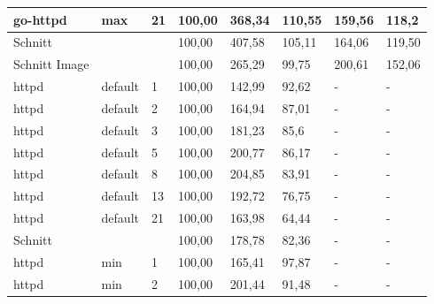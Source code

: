 \begin{footnotesize}
\begin{longtable}{llllllll}
		go-httpd       & max     & 21         & 100,00 & 368,34                      & 110,55                      & 159,56                      & 118,2                       \\ \hline
		Schnitt        &         &            & 100,00 & 407,58                      & 105,11                      & 164,06                      & 119,50                      \\ \hline
		Schnitt Image  &         &            & 100,00 & 265,29                      & 99,75                       & 200,61                      & 152,06                      \\ \hline
		httpd          & default & 1          & 100,00 & 142,99                      & 92,62                       & -                           & -                           \\
		httpd          & default & 2          & 100,00 & 164,94                      & 87,01                       & -                           & -                           \\
		httpd          & default & 3          & 100,00 & 181,23                      & 85,6                        & -                           & -                           \\
		httpd          & default & 5          & 100,00 & 200,77                      & 86,17                       & -                           & -                           \\
		httpd          & default & 8          & 100,00 & 204,85                      & 83,91                       & -                           & -                           \\
		httpd          & default & 13         & 100,00 & 192,72                      & 76,75                       & -                           & -                           \\
		httpd          & default & 21         & 100,00 & 163,98                      & 64,44                       & -                           & -                           \\ \hline
		Schnitt        &         &            & 100,00 & 178,78                      & 82,36                       & -                           & -                           \\ \hline
		httpd          & min     & 1          & 100,00 & 165,41                      & 97,87                       & -                           & -                           \\
		httpd          & min     & 2          & 100,00 & 201,44                      & 91,48                       & -                           & -                           \\

\end{longtable}
\end{footnotesize}
